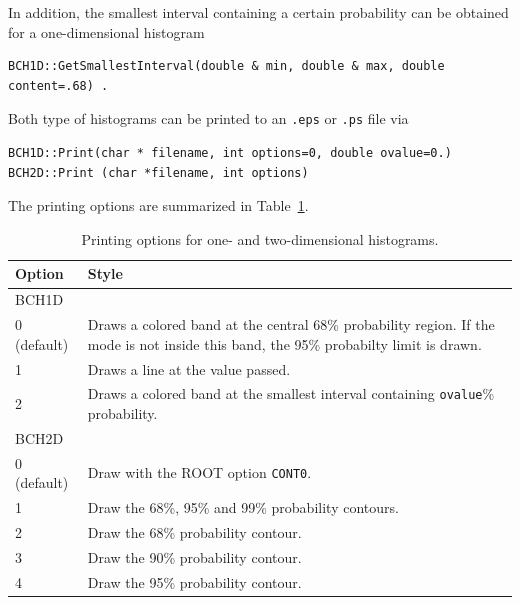 \documentclass[11pt, a4paper]{article}
\begin{document}
\noindent 
In addition, the smallest interval containing a certain probability
can be obtained for a one-dimensional histogram 
%
\begin{verbatim}
BCH1D::GetSmallestInterval(double & min, double & max, double content=.68) . 
\end{verbatim}

\noindent 
Both type of histograms can be printed to an \verb|.eps| or \verb|.ps|
file via

\begin{verbatim}
BCH1D::Print(char * filename, int options=0, double ovalue=0.)
BCH2D::Print (char *filename, int options)
\end{verbatim}  

The printing options are summarized in Table~\ref{table:printingoptions}. 

\begin{table}[ht!]
\begin{tabular}{ll}
\hline
Option & Style \\ 
\hline
BCH1D & \\ 
\hline 
0 (default) & \begin{minipage}[l]{12 cm}Draws a colored band at the central 68\% probability region. If the mode is not inside this band, the 95\% probabilty limit is drawn. \end{minipage}\\ 
1           & Draws a line at the value passed. \\ 
2           & Draws a colored band at the smallest interval containing \verb|ovalue|\% probability. \\
\hline 
BCH2D & \\ 
\hline 
0 (default) & Draw with the ROOT option \verb|CONT0|. \\ 
1           & Draw the 68\%, 95\% and 99\% probability contours. \\ 
2           & Draw the 68\% probability contour. \\ 
3           & Draw the 90\% probability contour. \\ 
4           & Draw the 95\% probability contour. \\ 
\hline
\end{tabular}
\caption{Printing options for one- and two-dimensional histograms. 
\label{table:printingoptions}} 
\end{table}

\pagebreak 

\end{document}
